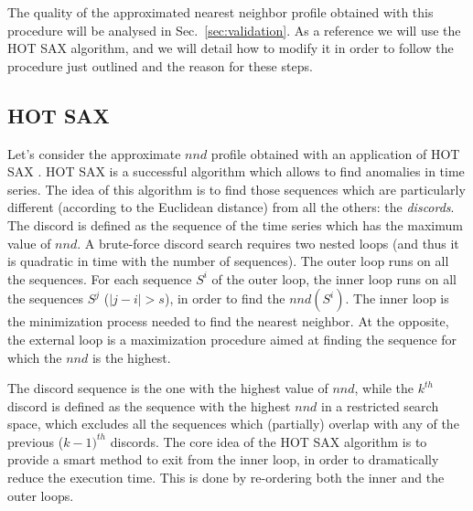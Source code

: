 \documentclass[a4paper,twoside]{article}
\begin{document}
The quality of the approximated nearest neighbor profile obtained with this procedure will be analysed in Sec.~\ref{sec:validation}. 
As a reference we will use the HOT SAX algorithm, and we will detail how to modify it in order to follow the procedure just outlined and the reason for these steps.

\subsection*{HOT SAX}\label{ssec:hotsax}
Let's consider the approximate $nnd$ profile obtained with an application of HOT SAX \cite{hotsax}.
HOT SAX is a successful algorithm which allows to find anomalies in time series.
%
The idea of this algorithm is to find 
those sequences which are particularly different (according to the Euclidean distance) from all the others: the \textit{discords}.
The discord is defined as the sequence of the time series which has the maximum value of $nnd$.  
%
% 
%
A brute-force  discord search requires two nested loops (and thus it is quadratic in time with the number of sequences). The outer loop runs on all the sequences.
%
For each sequence $S^i$ of the outer loop, the inner loop runs on all the sequences $S^j$ ($|j -i|> s$),  in order to find the $nnd(S^i)$. The inner loop is the  minimization process needed to find the nearest neighbor. At the opposite, the external loop is a maximization procedure aimed at finding the sequence for which the $nnd$ is the highest.

%
%
The discord sequence is the one with the highest value of $nnd$,
%
while the $k^{th}$ discord is defined as the sequence with the highest $nnd$ in a restricted search space, which excludes all the sequences which (partially) overlap with any of the previous ($k-1)^{th}$ discords. 
%
%
The core idea of the HOT SAX algorithm is to provide a smart method to exit from the inner loop, in order to dramatically reduce the execution time. This is done by re-ordering both the inner and the outer loops.
\end{document}

